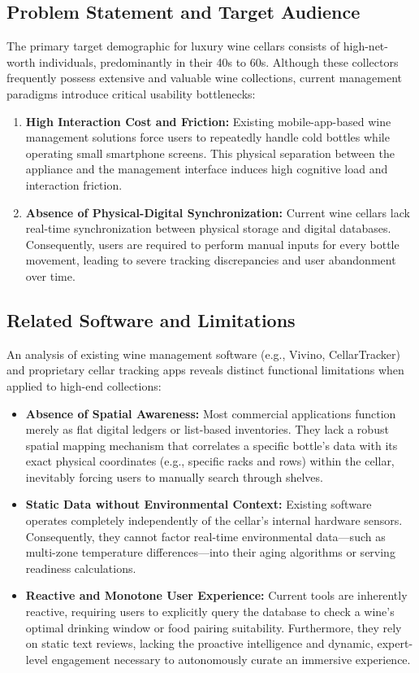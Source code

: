 \documentclass[conference]{IEEEtran}
\begin{document}
\subsection{Problem Statement and Target Audience}
The primary target demographic for luxury wine cellars consists of high-net-worth individuals, predominantly in their 40s to 60s. Although these collectors frequently possess extensive and valuable wine collections, current management paradigms introduce critical usability bottlenecks:
\begin{enumerate}
    \item \textbf{High Interaction Cost and Friction:} Existing mobile-app-based wine management solutions force users to repeatedly handle cold bottles while operating small smartphone screens. This physical separation between the appliance and the management interface induces high cognitive load and interaction friction.
    \item \textbf{Absence of Physical-Digital Synchronization:} Current wine cellars lack real-time synchronization between physical storage and digital databases. Consequently, users are required to perform manual inputs for every bottle movement, leading to severe tracking discrepancies and user abandonment over time.
\end{enumerate}

\subsection{Related Software and Limitations}
An analysis of existing wine management software (e.g., Vivino, CellarTracker) and proprietary cellar tracking apps reveals distinct functional limitations when applied to high-end collections:
\begin{itemize}
    \item \textbf{Absence of Spatial Awareness:} Most commercial applications function merely as flat digital ledgers or list-based inventories. They lack a robust spatial mapping mechanism that correlates a specific bottle's data with its exact physical coordinates (e.g., specific racks and rows) within the cellar, inevitably forcing users to manually search through shelves.
    \item \textbf{Static Data without Environmental Context:} Existing software operates completely independently of the cellar's internal hardware sensors. Consequently, they cannot factor real-time environmental data—such as multi-zone temperature differences—into their aging algorithms or serving readiness calculations.
    \item \textbf{Reactive and Monotone User Experience:} Current tools are inherently reactive, requiring users to explicitly query the database to check a wine's optimal drinking window or food pairing suitability. Furthermore, they rely on static text reviews, lacking the proactive intelligence and dynamic, expert-level engagement necessary to autonomously curate an immersive experience.
\end{itemize}
\end{document}
